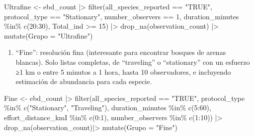 \documentclass[
]{article}
\newenvironment{Shaded}{\begin{snugshade}}{\end{snugshade}}
\newcommand{\AttributeTok}[1]{\textcolor[rgb]{0.77,0.63,0.00}{#1}}
\newcommand{\DecValTok}[1]{\textcolor[rgb]{0.00,0.00,0.81}{#1}}
\newcommand{\FunctionTok}[1]{\textcolor[rgb]{0.00,0.00,0.00}{#1}}
\newcommand{\NormalTok}[1]{#1}
\newcommand{\OtherTok}[1]{\textcolor[rgb]{0.56,0.35,0.01}{#1}}
\newcommand{\SpecialCharTok}[1]{\textcolor[rgb]{0.00,0.00,0.00}{#1}}
\newcommand{\StringTok}[1]{\textcolor[rgb]{0.31,0.60,0.02}{#1}}
\providecommand{\tightlist}{%
  \setlength{\itemsep}{0pt}\setlength{\parskip}{0pt}}
\begin{document}
\begin{Shaded}
\begin{Highlighting}[]
\NormalTok{Ultrafine }\OtherTok{\textless{}{-}}\NormalTok{ ebd\_count }\SpecialCharTok{|\textgreater{}}
  \FunctionTok{filter}\NormalTok{(all\_species\_reported }\SpecialCharTok{==} \StringTok{"TRUE"}\NormalTok{,}
\NormalTok{         protocol\_type }\SpecialCharTok{==} \StringTok{"Stationary"}\NormalTok{,}
\NormalTok{         number\_observers }\SpecialCharTok{==} \DecValTok{1}\NormalTok{,}
\NormalTok{         duration\_minutes }\SpecialCharTok{\%in\%} \FunctionTok{c}\NormalTok{(}\DecValTok{20}\SpecialCharTok{:}\DecValTok{30}\NormalTok{),}
\NormalTok{         Total\_ind }\SpecialCharTok{\textgreater{}=} \DecValTok{15}\NormalTok{) }\SpecialCharTok{|\textgreater{}}
  \FunctionTok{drop\_na}\NormalTok{(observation\_count) }\SpecialCharTok{|\textgreater{}}
  \FunctionTok{mutate}\NormalTok{(}\AttributeTok{Grupo =} \StringTok{"Ultrafine"}\NormalTok{)}
\end{Highlighting}
\end{Shaded}

\begin{enumerate}
\def\labelenumi{\arabic{enumi}.}
\setcounter{enumi}{1}
\tightlist
\item
  ``Fine'': resolución fina (interesante para encontrar bosques de
  arenas blancas). Solo listas completas, de ``traveling'' o
  ``stationary'' con un esfuerzo ≥1 km o entre 5 minutos a 1 hora, hasta
  10 observadores, e incluyendo estimación de abundancia para cada
  especie.
\end{enumerate}

\begin{Shaded}
\begin{Highlighting}[]
\NormalTok{Fine }\OtherTok{\textless{}{-}}\NormalTok{ ebd\_count }\SpecialCharTok{|\textgreater{}}
  \FunctionTok{filter}\NormalTok{(all\_species\_reported }\SpecialCharTok{==} \StringTok{"TRUE"}\NormalTok{,}
\NormalTok{         protocol\_type }\SpecialCharTok{\%in\%} \FunctionTok{c}\NormalTok{(}\StringTok{"Stationary"}\NormalTok{, }\StringTok{"Traveling"}\NormalTok{),}
\NormalTok{         duration\_minutes }\SpecialCharTok{\%in\%} \FunctionTok{c}\NormalTok{(}\DecValTok{5}\SpecialCharTok{:}\DecValTok{60}\NormalTok{),}
\NormalTok{         effort\_distance\_kmI }\SpecialCharTok{\%in\%} \FunctionTok{c}\NormalTok{(}\DecValTok{0}\SpecialCharTok{:}\DecValTok{1}\NormalTok{),}
\NormalTok{         number\_observers }\SpecialCharTok{\%in\%} \FunctionTok{c}\NormalTok{(}\DecValTok{1}\SpecialCharTok{:}\DecValTok{10}\NormalTok{)) }\SpecialCharTok{|\textgreater{}}
  \FunctionTok{drop\_na}\NormalTok{(observation\_count)}\SpecialCharTok{|\textgreater{}}
  \FunctionTok{mutate}\NormalTok{(}\AttributeTok{Grupo =} \StringTok{"Fine"}\NormalTok{)}
\end{Highlighting}
\end{Shaded}
\end{document}
